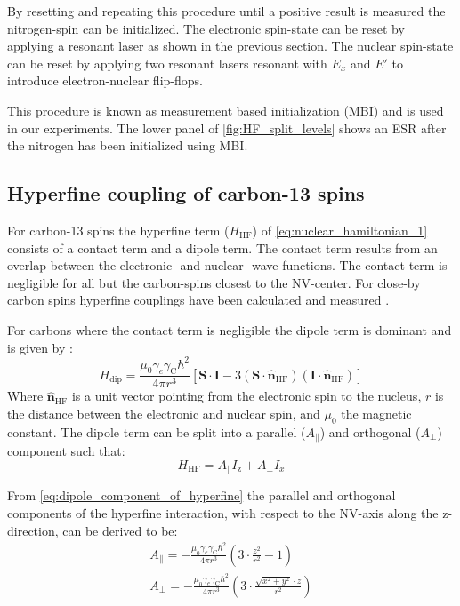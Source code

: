 By resetting and repeating this procedure until a positive result is measured the nitrogen-spin can be initialized.
The electronic spin-state can be reset by applying a resonant laser as shown in the previous section.
The nuclear spin-state can be reset by applying two resonant lasers resonant with $E_x$ and $E'$ to introduce electron-nuclear flip-flops.

This procedure is known as measurement based initialization (MBI) and is used in our experiments.
The lower panel of \cref{fig:HF_split_levels} shows an ESR after the nitrogen has been initialized using MBI.

\subsection{Hyperfine coupling of carbon-13 spins}
For carbon-13 spins the hyperfine term ($H_{\mathrm{HF}}$) of \cref{eq:nuclear_hamiltonian_1} consists of a contact term and a dipole term.
The contact term results from an overlap between the electronic- and nuclear- wave-functions.
The contact term is negligible for all but the carbon-spins closest to the NV-center.
For close-by carbon spins hyperfine couplings have been calculated \citep{Gali2008Ab,Gali2009Identification} and measured \citep{Smeltzer201113}.

For carbons where the contact term is negligible the dipole term is dominant and is given by \citep{Lange2012Quantum}:
\begin{equation}
\label{eq:dipole_component_of_hyperfine}
H_{\mathrm{dip}} = \frac{\mu_0 \gamma_e \gamma_{\mathrm{C}} \hbar^2 }{4 \pi r^3} [ \bm{S \cdot I} - 3 (\bm S \cdot \hat{\bm{n}}_{\mathrm{HF}})(\bm I \cdot \hat{\bm{n}}_{\mathrm{HF}})]
\end{equation}
Where $\hat{\bm{n}}_{\mathrm{HF}}$ is a unit vector pointing from the electronic spin to the nucleus, $r$ is the distance between the electronic and nuclear spin, and $\mu_0$ the magnetic constant.
The dipole term can be split into a parallel ($A_\parallel $) and orthogonal ($A_\perp$) component such that:
\begin{equation}
     H_{\mathrm{HF}} = A_\parallel I_\mathrm{z} + A_\perp I_x
 \end{equation}


From \cref{eq:dipole_component_of_hyperfine}  the parallel and orthogonal components of the hyperfine interaction, with respect to the NV-axis along the z-direction, can be derived to be:
 \begin{align}
A_\parallel= - \frac{\mu_0 \gamma_e \gamma_{\mathrm{C}} \hbar^2 }{4 \pi r^3} \left(3\cdot \frac{z^2}{r^2}-1\right)\\
 A_\perp =  -\frac{\mu_0 \gamma_e \gamma_{\mathrm{C}} \hbar^2 }{4 \pi r^3}\left( 3\cdot\frac{\sqrt{x^2+y^2}\cdot z}{r^2}\right)
\end{align}



